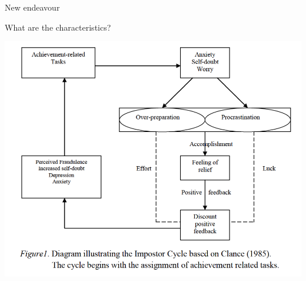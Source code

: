 \documentclass[aspectratio=169]{beamer}
\begin{document}
\begin{frame}
  \begin{center}
    \Huge New endeavour
    \\ \small \cite{apa13}
  \end{center}
\end{frame}

\begin{frame}
  \begin{center}
    \Huge What are the characteristics?
  \end{center}
\end{frame}

\begin{frame}
  \begin{center}
    \includegraphics[scale=.5]{./assets/clance-impostor-cycle.png}
    \\ \small \cite{sakulku11}
  \end{center}
\end{frame}
\end{document}
